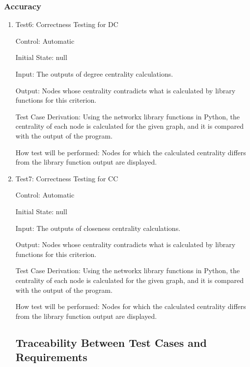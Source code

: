 \documentclass[12pt, titlepage]{article}
\begin{document}
\subsubsection{Accuracy}
\begin{enumerate}
\item{Test6: Correctness Testing for DC\\}

Control: Automatic
					
Initial State: null
					
Input:  The outputs of degree  centrality calculations.
					
Output: Nodes whose centrality contradicts what is calculated by library functions for this criterion.

Test Case Derivation: Using the networkx library functions in Python, the centrality of each node is calculated for the given graph, and it is compared with the output of the program.

How test will be performed: Nodes for which the calculated centrality differs from the library function output are displayed.

\item{Test7: Correctness Testing for CC\\}

Control: Automatic
					
Initial State: null
					
Input: The outputs of closeness centrality calculations.
					
Output: Nodes whose centrality contradicts what is calculated by library functions for this criterion.

Test Case Derivation: Using the networkx library functions in Python, the centrality of each node is calculated for the given graph, and it is compared with the output of the program.

How test will be performed: Nodes for which the calculated centrality differs from the library function output are displayed.

\subsection{Traceability Between Test Cases and Requirements}


\end{enumerate}
\end{document}

